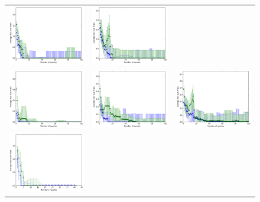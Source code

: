 \documentclass{article}
\renewcommand\[{\begin{equation}}
\renewcommand\]{\end{equation}}
\begin{document}
\begin{figure}[b]
\begin{tabular}{ccc}
        \includegraphics[width=12em]{figures/synthetic_4_uniform_sparse} &
        \includegraphics[width=12em]{figures/synthetic_5_uniform_sparse}
        \\
        \includegraphics[width=12em]{figures/synthetic_3_normal} &
        \includegraphics[width=12em]{figures/synthetic_4_normal} &
        \includegraphics[width=12em]{figures/synthetic_5_normal}
        \\
        \includegraphics[width=12em]{figures/synthetic_3_normal_sparse} &

\end{tabular}
\end{figure}
\end{document}

